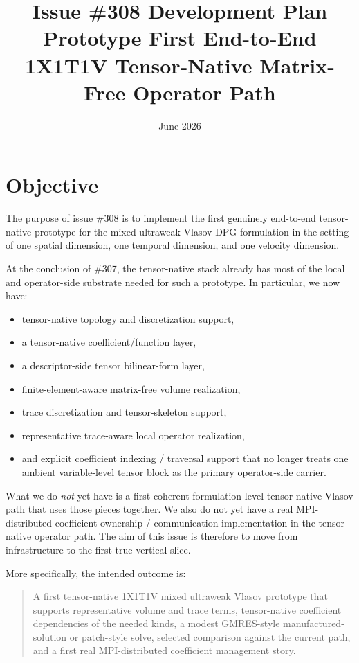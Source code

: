 \documentclass[11pt]{article}
\title{Issue \#308 Development Plan\\
Prototype First End-to-End 1X1T1V Tensor-Native Matrix-Free Operator Path}
\author{}
\date{June 2026}
\begin{document}
\maketitle

\section{Objective}

The purpose of issue \#308 is to implement the first genuinely end-to-end tensor-native prototype for the mixed ultraweak Vlasov DPG formulation in the setting of one spatial dimension, one temporal dimension, and one velocity dimension.

At the conclusion of \#307, the tensor-native stack already has most of the local and operator-side substrate needed for such a prototype. In particular, we now have:
\begin{itemize}[leftmargin=2em]
\item tensor-native topology and discretization support,
\item a tensor-native coefficient/function layer,
\item a descriptor-side tensor bilinear-form layer,
\item finite-element-aware matrix-free volume realization,
\item trace discretization and tensor-skeleton support,
\item representative trace-aware local operator realization,
\item and explicit coefficient indexing / traversal support that no longer treats one ambient variable-level tensor block as the primary operator-side carrier.
\end{itemize}

What we do \emph{not} yet have is a first coherent formulation-level tensor-native Vlasov path that uses those pieces together. We also do not yet have a real MPI-distributed coefficient ownership / communication implementation in the tensor-native operator path. The aim of this issue is therefore to move from infrastructure to the first true vertical slice.

More specifically, the intended outcome is:
\begin{quote}
A first tensor-native 1X1T1V mixed ultraweak Vlasov prototype that supports representative volume and trace terms, tensor-native coefficient dependencies of the needed kinds, a modest GMRES-style manufactured-solution or patch-style solve, selected comparison against the current path, and a first real MPI-distributed coefficient management story.
\end{quote}
\end{document}
